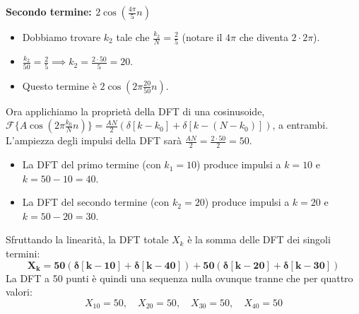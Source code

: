 \begin{soluzione}{22}
\begin{enumerate}
        \textbf{Secondo termine: $2\cos\left(\frac{4\pi}{5}n\right)$}
        \begin{itemize}
            \item Dobbiamo trovare $k_2$ tale che $\frac{k_2}{N} = \frac{2}{5}$ (notare il $4\pi$ che diventa $2 \cdot 2\pi$).
            \item $\frac{k_2}{50} = \frac{2}{5} \implies k_2 = \frac{2 \cdot 50}{5} = 20$.
            \item Questo termine è $2\cos(2\pi \frac{20}{50}n)$.
        \end{itemize}
        
        Ora applichiamo la proprietà della DFT di una cosinusoide, $\mathcal{F}\{A\cos(2\pi \frac{k_0}{N}n)\} = \frac{AN}{2}(\delta[k-k_0] + \delta[k-(N-k_0)])$, a entrambi.
        L'ampiezza degli impulsi della DFT sarà $\frac{AN}{2} = \frac{2 \cdot 50}{2} = 50$.
        
        \begin{itemize}
            \item La DFT del primo termine (con $k_1=10$) produce impulsi a $k=10$ e $k=50-10=40$.
            \item La DFT del secondo termine (con $k_2=20$) produce impulsi a $k=20$ e $k=50-20=30$.
        \end{itemize}
        
        Sfruttando la linearità, la DFT totale $X_k$ è la somma delle DFT dei singoli termini:
        \[
            \mathbf{X_k = 50(\delta[k-10] + \delta[k-40]) + 50(\delta[k-20] + \delta[k-30])}
        \]
        La DFT a 50 punti è quindi una sequenza nulla ovunque tranne che per quattro valori:
        \[
            X_{10} = 50, \quad X_{20} = 50, \quad X_{30} = 50, \quad X_{40} = 50
        \]
        
    \end{enumerate}
\end{soluzione}